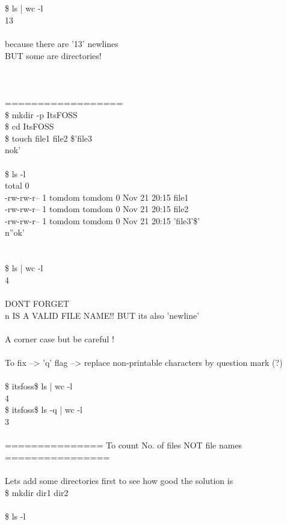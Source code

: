 \documentclass[10pt,a4paper]{article}
\begin{document}
{\\
\\
\$ ls | wc -l\\
13\\
\\
because there are '13' newlines\\
BUT some are directories! \\
\\
\\
\\
==================\\
\$ mkdir -p ItsFOSS\\
\$ cd ItsFOSS\\
\$ touch file1 file2 \$'file3\\nok'\\
\\
\$ ls -l\\
total 0\\
-rw-rw-r-- 1 tomdom tomdom 0 Nov 21 20:15  file1\\
-rw-rw-r-- 1 tomdom tomdom 0 Nov 21 20:15  file2\\
-rw-rw-r-- 1 tomdom tomdom 0 Nov 21 20:15 'file3'\$'\\n''ok'\\
\\
\\
\$ ls | wc -l\\
4\\
\\
DONT FORGET \\n IS A VALID FILE NAME!!  BUT its also 'newline'\\
\\
A corner case but be careful !\\
\\
To fix --> 'q' flag --> replace non-printable characters by question mark (?)\\
\\
\$ itsfoss\$ ls | wc -l\\
4\\
\$ itsfoss\$ ls -q | wc -l\\
3\\
\\
===============  To count No. of files  NOT file names  ================\\
\\
Lets add some directories first to see how good the solution is\\
\$ mkdir dir1 dir2\\
\\
\$ ls -l\\
}
\end{document}
